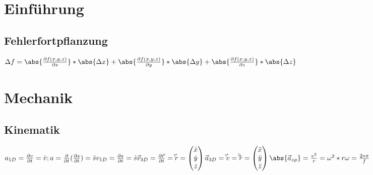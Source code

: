 \documentclass[10pt,a4paper]{article}
\begin{document}
\twocolumn
\pagestyle{fancy}

	\section{Einführung}
	\subsection{Fehlerfortpflanzung}
		\begin{mdframed}[style=exercise]
			\begin{math}
				\Delta f = \abs{\frac{\partial f(x,y,z)}{\partial x}} * \abs{\Delta x} + \abs{\frac{\partial f(x,y,z)}{\partial y}} * \abs{\Delta y} + \abs{\frac{\partial f(x,y,z)}{\partial z}} * \abs{\Delta z}
			\end{math}
		\end{mdframed}

	\section{Mechanik}

	\subsection{Kinematik}
	\begin{mdframed}[style=exercise]
		\begin{math}
			a_{1D} = \frac{\partial v}{\partial t} = \dot v; a = \frac{\partial}{\partial t}(\frac{\partial s}{\partial t}) = \ddot s
			\newline
			v_{1D} = \frac{\partial s}{\partial t} = \dot s
			\newline
			\vec v_{3D} = \frac{\partial\vec r}{\partial t} = \vec\dot r = \begin{pmatrix} \dot x \\ \dot y \\ \dot z \end{pmatrix}
			\newline
			\vec a_{3D} = \vec\dot v = \ddot\vec r = \begin{pmatrix} \ddot x \\ \ddot y \\ \ddot z \end{pmatrix}
			\newline
			\abs{\vec a_{zp}} = \frac{v^2}{r} = \omega^2 * r
			\newline
			\omega = \frac{2*\pi}{f}
		\end{math}
	\end{mdframed}
\end{document}
